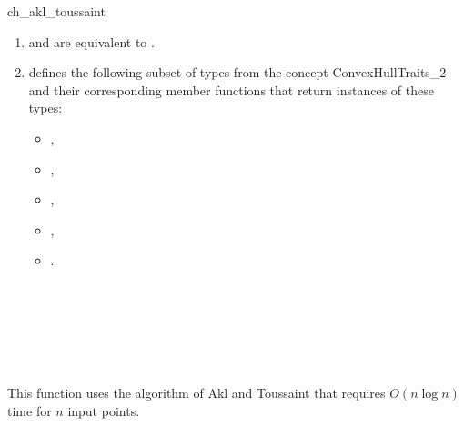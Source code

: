 \begin{ccRefFunction}{ch_akl_toussaint}
\begin{enumerate}
   \item    {} and 
            are equivalent to .
   \item    {} defines the following subset of types from
            the concept ConvexHullTraits\_2 and their corresponding member
            functions that return instances of these types:
            \begin{itemize}
                \item {},
                \item {}, 
                \item {},
                \item {},
		\item {}.
            \end{itemize}
\end{enumerate}


\ccSeeAlso

 \\
 \\
 \\
 \\
 \\

\ccImplementation

This function uses the algorithm of Akl and
Toussaint \cite{at-fcha-78} that requires $O(n \log n)$ time for $n$ input
points.  

\end{ccRefFunction}


